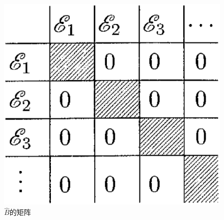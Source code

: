\documentclass[a4paper,zihao=-4,linespread=1]{ctexrep}
\begin{document}
    \begin{figure}[htbp]
        \centering
        \includegraphics[scale=0.3]{fig/3-1.eps}
        \caption{$\hat{B}$的矩阵}
        \label{分块对角阵}
    \end{figure}
\end{document}
